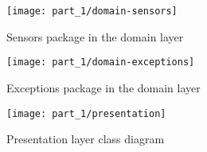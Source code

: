 \begin{figure}
\caption{Sensors package in the domain layer}
\centering
\texttt{[image: part\_1/domain-sensors]}
\end{figure}

\begin{figure}
\caption{Exceptions package in the domain layer }
\centering
\texttt{[image: part\_1/domain-exceptions]}
\end{figure}

\begin{figure}
\caption{Presentation layer class diagram}
\centering
\texttt{[image: part\_1/presentation]}
\end{figure}
